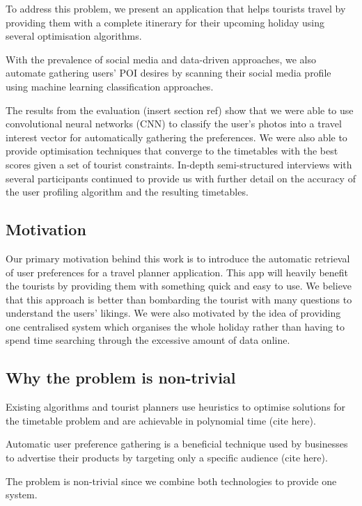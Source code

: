 To address this problem, we present an application
that helps tourists travel by providing them with a
complete itinerary for their upcoming holiday using
several optimisation algorithms. 

With the prevalence of social media and data-driven
approaches, we also automate gathering users' POI
desires by scanning their social media profile using
machine learning classification approaches.

The results from the evaluation (insert section ref)
show that we were able to use convolutional neural
networks (CNN) to classify the user's photos into a
travel interest vector for automatically gathering the
preferences. We were also able to provide optimisation
techniques that converge to the timetables with the
best scores given a set of tourist constraints.
In-depth semi-structured interviews with several
participants continued to provide us with further
detail on the accuracy of the user profiling algorithm
and the resulting timetables. 

\subsection{Motivation}

Our primary motivation behind this work is
to introduce the automatic retrieval of user
preferences for a travel planner application. This app
will heavily benefit the tourists by providing them
with something quick and easy to use. We believe that
this approach is better than bombarding the tourist
with many questions to understand the users' likings.
We were also motivated by the idea of providing one
centralised system which organises the whole holiday
rather than having to spend time searching through the
excessive amount of data online. 

\subsection{Why the problem is non-trivial}

Existing algorithms and tourist planners use
heuristics to optimise solutions for the timetable
problem and are achievable in polynomial time (cite
here). 

Automatic user preference gathering is a beneficial
technique used by businesses to advertise their
products by targeting only a specific audience (cite
here).  

The problem is non-trivial since we combine both
technologies to provide one system.

